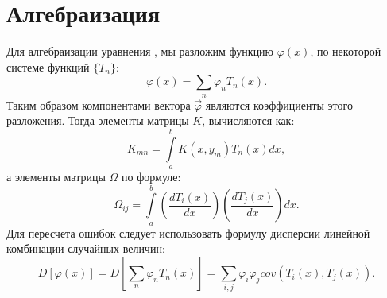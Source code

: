 \chapter{Алгебраизация}
\label{algebra}

Для алгебраизации уравнения , мы разложим функцию $\varphi(x)$, по некоторой системе функций $\{T_n\}$:
\begin{equation}
\varphi(x) = \sum \limits_n \varphi_n T_n(x).
\end{equation}
Таким образом компонентами вектора $\vec{\varphi}$ являются коэффициенты этого разложения. Тогда элементы матрицы $K$, вычисляются как:
\begin{equation}
K_{mn} = \int\limits_a^b K(x,y_m)T_n(x)dx,
\end{equation}
а элементы матрицы $\Omega$ по формуле:
\begin{equation}
\Omega_{ij} = \int\limits_a^b \left(\frac{dT_i(x)}{dx}\right)\left(\frac{dT_j(x)}{dx}\right)dx. 
\end{equation}
Для пересчета ошибок следует использовать формулу дисперсии линейной комбинации случайных величин:
\begin{equation}
D[\varphi(x)] = D[\sum \limits_n \varphi_n T_n(x)] = \sum\limits_{i,j} \varphi_i\varphi_j cov(T_i(x), T_j(x)).
\end{equation}
